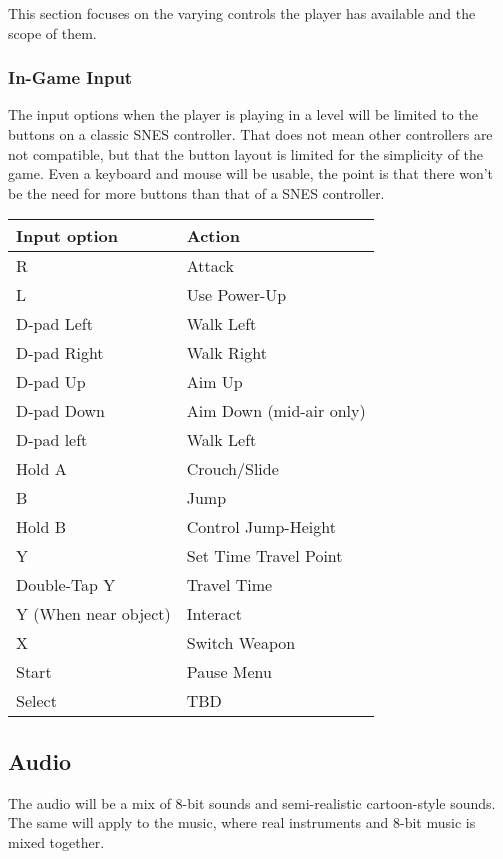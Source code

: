 \documentclass[12pt]{article}
\begin{document}
This section focuses on the varying controls the player has available and the scope of them. 

\subsubsection{In-Game Input}

The input options when the player is playing in a level will be limited to the buttons on a classic SNES controller. That does not mean other controllers are not compatible, but that the button layout is limited for the simplicity of the game. Even a keyboard and mouse will be usable, the point is that there won't be the need for more buttons than that of a SNES controller. 

\begin{center}
\begin{tabular}{ | l | l | }
 \hline
 \textbf{Input option} & \textbf{Action} \\
 \hline
 R & Attack \\  
 \hline 
 L & Use Power-Up \\
 \hline
 D-pad Left & Walk Left \\
 \hline
 D-pad Right & Walk Right \\
 \hline
 D-pad Up & Aim Up \\
 \hline
 D-pad Down & Aim Down (mid-air only) \\
 \hline
 D-pad left & Walk Left \\
 \hline
 Hold A & Crouch/Slide \\
 \hline
 B & Jump \\
 \hline
 Hold B & Control Jump-Height\\
 \hline
 Y & Set Time Travel Point \\
 \hline
 Double-Tap Y & Travel Time \\
 \hline
  Y (When near object) & Interact \\
 \hline
 X & Switch Weapon \\
 \hline
 Start & Pause Menu \\
 \hline
 Select & TBD \\
 \hline
\end{tabular}
\end{center}

\subsection{Audio}

The audio will be a mix of 8-bit sounds and semi-realistic cartoon-style sounds. The same will apply to the music, where real instruments and 8-bit music is mixed together. 
\end{document}
